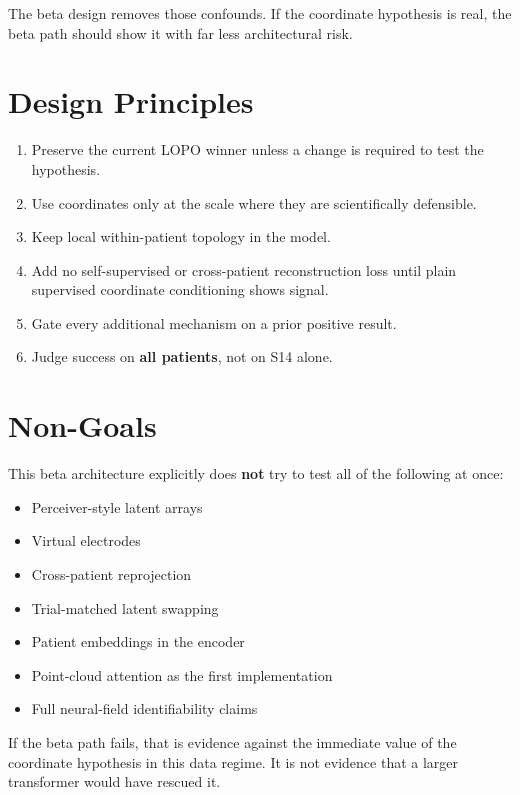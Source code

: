 \documentclass[
]{article}
\providecommand{\tightlist}{%
  \setlength{\itemsep}{0pt}\setlength{\parskip}{0pt}}
\begin{document}
The beta design removes those confounds. If the coordinate hypothesis is
real, the beta path should show it with far less architectural risk.

\section{Design Principles}\label{design-principles}

\begin{enumerate}
\def\labelenumi{\arabic{enumi}.}
\tightlist
\item
  Preserve the current LOPO winner unless a change is required to test
  the hypothesis.
\item
  Use coordinates only at the scale where they are scientifically
  defensible.
\item
  Keep local within-patient topology in the model.
\item
  Add no self-supervised or cross-patient reconstruction loss until
  plain supervised coordinate conditioning shows signal.
\item
  Gate every additional mechanism on a prior positive result.
\item
  Judge success on \textbf{all patients}, not on S14 alone.
\end{enumerate}

\section{Non-Goals}\label{non-goals}

This beta architecture explicitly does \textbf{not} try to test all of
the following at once:

\begin{itemize}
\tightlist
\item
  Perceiver-style latent arrays
\item
  Virtual electrodes
\item
  Cross-patient reprojection
\item
  Trial-matched latent swapping
\item
  Patient embeddings in the encoder
\item
  Point-cloud attention as the first implementation
\item
  Full neural-field identifiability claims
\end{itemize}

If the beta path fails, that is evidence against the immediate value of
the coordinate hypothesis in this data regime. It is not evidence that a
larger transformer would have rescued it.
\end{document}
